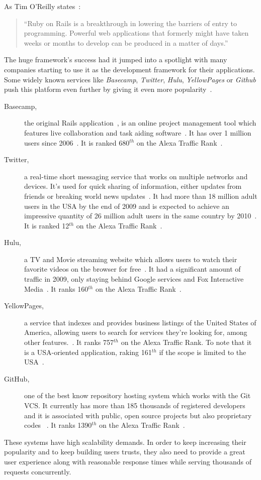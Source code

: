 As Tim O'Reilly states~\cite{oreilly_ror}:
\begin{quote}
  ``Ruby on Rails is a breakthrough in lowering the barriers of entry to programming. Powerful web applications that formerly might have taken weeks or months to develop can be produced in a matter of days.''
\end{quote}
The huge framework's success had it jumped into a spotlight with many companies starting to use it as the development framework for their applications. Some widely known services like \textit{Basecamp}, \textit{Twitter}, \textit{Hulu}, \textit{YellowPages} or \textit{Github} push this platform even further by giving it even more popularity~\cite{rubyonrails_applications}.

\begin{description}
  \item[Basecamp,] the original Rails application~\cite{rubyonrails_applications}, is an online project management tool which features live collaboration and task aiding software~\cite{basecamp}. It has over 1 million users since 2006~\cite{basecamp_turns_1000000}. It is ranked 680$^{th}$ on the Alexa Traffic Rank~\cite{alexa}.
  \item[Twitter,] a real-time short messaging service that works on multiple networks and devices. It's used for quick sharing of information, either updates from friends or breaking world news updates~\cite{twitter}. It had more than 18 million adult users in the USA by the end of 2009 and is expected to achieve an impressive quantity of 26 million adult users in the same country by 2010~\cite{emarketer_twitter_usage}. It is ranked 12$^{th}$ on the Alexa Traffic Rank~\cite{alexa}.
  \item[Hulu,] a TV and Movie streaming website which allows users to watch their favorite videos on the browser for free~\cite{hulu}. It had a significant amount of traffic in 2009, only staying behind Google services and Fox Interactive Media~\cite{hulu_growth}. It ranks 160$^{th}$ on the Alexa Traffic Rank~\cite{alexa}.
  \item[YellowPages,] a service that indexes and provides business listings of the United States of America, allowing users to search for services they're looking for, among other features.~\cite{yellowpages}.  It ranks 757$^{th}$ on the Alexa Traffic Rank. To note that it is a USA-oriented application, raking 161$^{th}$ if the scope is limited to the USA~\cite{alexa}.
  \item[GitHub,] one of the best know repository hosting system which works with the Git VCS. It currently has more than 185 thousands of registered developers and it is associated with public, open source projects but also proprietary codes ~\cite{github}. It ranks 1390$^{th}$ on the Alexa Traffic Rank~\cite{alexa}.
\end{description}
These systems have high scalability demands. In order to keep increasing their popularity and to keep building users trusts, they also need to provide a great user experience along with reasonable response times while serving thousands of requests concurrently.

